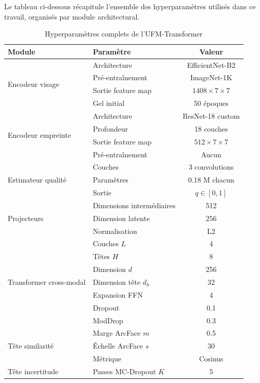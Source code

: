 \documentclass[12pt,a4paper]{report}
\begin{document}
Le tableau ci-dessous r\'{e}capitule l'ensemble des hyperparam\`{e}tres utilis\'{e}s dans ce travail, organis\'{e}s par module architectural.

\begin{table}[h]
\centering
\caption{Hyperparam\`{e}tres complets de l'UFM-Transformer}
\label{tab:hyperparams-complets}
\small
\begin{tabular}{llc}
\hline
\hline
\textbf{Module} & \textbf{Param\`{e}tre} & \textbf{Valeur} \\
\hline
\multirow{4}{*}{Encodeur visage} & Architecture & EfficientNet-B2 \\
 & Pr\'{e}-entra\^{i}nement & ImageNet-1K \\
 & Sortie feature map & $1408 \times 7 \times 7$ \\
 & Gel initial & 50 \'{e}poques \\
\hline
\multirow{4}{*}{Encodeur empreinte} & Architecture & ResNet-18 custom \\
 & Profondeur & 18 couches \\
 & Sortie feature map & $512 \times 7 \times 7$ \\
 & Pr\'{e}-entra\^{i}nement & Aucun \\
\hline
\multirow{3}{*}{Estimateur qualit\'{e}} & Couches & 3 convolutions \\
 & Param\`{e}tres & 0.18 M chacun \\
 & Sortie & $q \in [0, 1]$ \\
\hline
\multirow{3}{*}{Projecteurs} & Dimensions interm\'{e}diaires & 512 \\
 & Dimension latente & 256 \\
 & Normalisation & L2 \\
\hline
\multirow{7}{*}{Transformer cross-modal} & Couches $L$ & 4 \\
 & T\^{e}tes $H$ & 8 \\
 & Dimension $d$ & 256 \\
 & Dimension t\^{e}te $d_h$ & 32 \\
 & Expansion FFN & 4 \\
 & Dropout & 0.1 \\
 & ModDrop & 0.3 \\
\hline
\multirow{3}{*}{T\^{e}te similarit\'{e}} & Marge ArcFace $m$ & 0.5 \\
 & \'{E}chelle ArcFace $s$ & 30 \\
 & M\'{e}trique & Cosinus \\
\hline
\multirow{3}{*}{T\^{e}te incertitude} & Passes MC-Dropout $K$ & 5 \\

\end{tabular}
\end{table}
\end{document}
